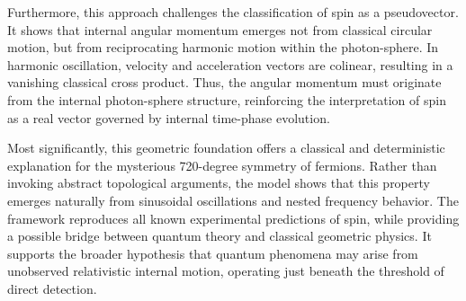 \documentclass[%
 reprint,
 amsmath,amssymb,
 aps,
]{revtex4-1}
\numberwithin{equation}{section}%
\begin{document}
Furthermore, this approach challenges the classification of spin as a pseudovector. It shows that internal angular momentum emerges not from classical circular motion, but from reciprocating harmonic motion within the photon-sphere. In harmonic oscillation, velocity and acceleration vectors are colinear, resulting in a vanishing classical cross product. Thus, the angular momentum must originate from the internal photon-sphere structure, reinforcing the interpretation of spin as a real vector governed by internal time-phase evolution.

Most significantly, this geometric foundation offers a classical and deterministic explanation for the mysterious 720-degree symmetry of fermions. Rather than invoking abstract topological arguments, the model shows that this property emerges naturally from sinusoidal oscillations and nested frequency behavior. The framework reproduces all known experimental predictions of spin, while providing a possible bridge between quantum theory and classical geometric physics. It supports the broader hypothesis that quantum phenomena may arise from unobserved relativistic internal motion, operating just beneath the threshold of direct detection.


\end{document}
